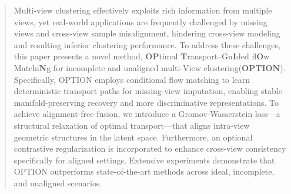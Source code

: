 \documentclass{article}
\theoremstyle{plain}
\theoremstyle{definition}
\theoremstyle{remark}
\begin{document}
\begin{abstract}
Multi-view clustering effectively exploits rich information from multiple views, yet real-world applications are frequently challenged by missing views and cross-view sample misalignment, hindering cross-view modeling and resulting inferior clustering performance.
To address these challenges, this paper presents a novel method, \textbf{OP}timal \textbf{T}ransport–Gu\textbf{I}ded fl\textbf{O}w Matchi\textbf{N}g for incomplete and unaligned multi-View clustering(\textbf{OPTION}). 
Specifically, OPTION employs conditional flow matching to learn deterministic transport paths for missing-view imputation, enabling stable manifold-preserving recovery and more discriminative representations. To achieve alignment-free fusion, we introduce a Gromov-Wasserstein loss—a structural relaxation of optimal transport—that aligns intra-view geometric structures in the latent space. Furthermore, an optional contrastive regularization is incorporated to enhance cross-view consistency specifically for aligned settings. Extensive experiments demonstrate that OPTION outperforms state-of-the-art methods across ideal, incomplete, and unaligned scenarios. 

\end{abstract}
\end{document}
